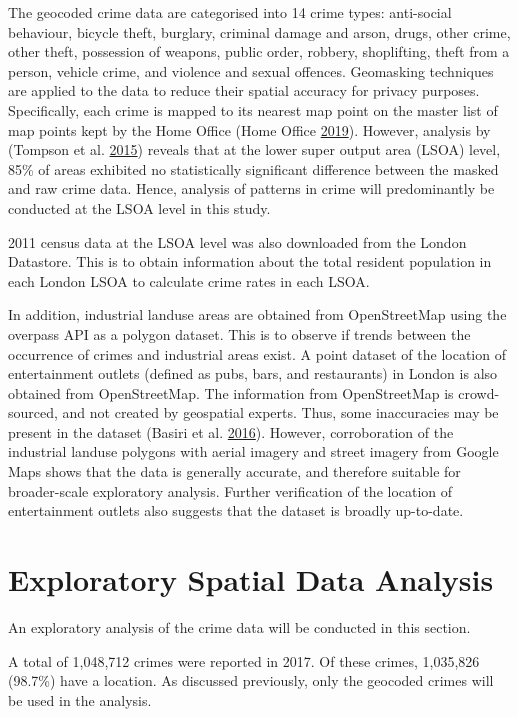 \documentclass[]{article}
\begin{document}
The geocoded crime data are categorised into 14 crime types: anti-social
behaviour, bicycle theft, burglary, criminal damage and arson, drugs,
other crime, other theft, possession of weapons, public order, robbery,
shoplifting, theft from a person, vehicle crime, and violence and sexual
offences. Geomasking techniques are applied to the data to reduce their
spatial accuracy for privacy purposes. Specifically, each crime is
mapped to its nearest map point on the master list of map points kept by
the Home Office (Home Office \protect\hyperlink{ref-Office2019}{2019}).
However, analysis by (Tompson et al.
\protect\hyperlink{ref-Tompson2015}{2015}) reveals that at the lower
super output area (LSOA) level, 85\% of areas exhibited no statistically
significant difference between the masked and raw crime data. Hence,
analysis of patterns in crime will predominantly be conducted at the
LSOA level in this study.

2011 census data at the LSOA level was also downloaded from the London
Datastore. This is to obtain information about the total resident
population in each London LSOA to calculate crime rates in each LSOA.

In addition, industrial landuse areas are obtained from OpenStreetMap
using the overpass API as a polygon dataset. This is to observe if
trends between the occurrence of crimes and industrial areas exist. A
point dataset of the location of entertainment outlets (defined as pubs,
bars, and restaurants) in London is also obtained from OpenStreetMap.
The information from OpenStreetMap is crowd-sourced, and not created by
geospatial experts. Thus, some inaccuracies may be present in the
dataset (Basiri et al. \protect\hyperlink{ref-Basiri2016}{2016}).
However, corroboration of the industrial landuse polygons with aerial
imagery and street imagery from Google Maps shows that the data is
generally accurate, and therefore suitable for broader-scale exploratory
analysis. Further verification of the location of entertainment outlets
also suggests that the dataset is broadly up-to-date.

\pagebreak

\section{Exploratory Spatial Data
Analysis}\label{exploratory-spatial-data-analysis}

An exploratory analysis of the crime data will be conducted in this
section.

A total of 1,048,712 crimes were reported in 2017. Of these crimes,
1,035,826 (98.7\%) have a location. As discussed previously, only the
geocoded crimes will be used in the analysis.
\end{document}
